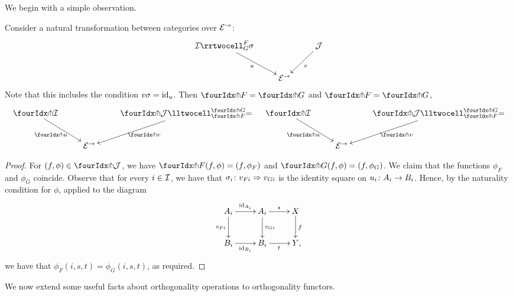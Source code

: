 \documentclass[reqno,10pt,a4paper,oneside,draft]{amsart}
\begin{document}
We begin with a simple observation. 

\begin{proposition} \label{thm:orth-nat}
Consider a natural transformation between categories over $\catE^\to$:
\[
\xymatrix{
  \cal{I}
  \rrtwocell_G^F{\sigma}
 \ar[dr]_{u}
&&
  \cal{J}
  \ar[dl]^{v}
\\&
  \catE^\to
}
\]
Note that this includes the condition $v \sigma = \id_u$.
Then $\liftr{F} = \liftr{G}$ and $\liftl{F} = \liftl{G}$, 
\begin{align*}
\xymatrix{
  \liftr{\cal{I}}
  \ar[dr]_{\liftr{u}}
&&
  \liftr{\cal{J}}
  \lltwocell_{\liftr{F}}^{\liftr{G}}{=}
  \ar[dl]^{\liftr{v}}
\\&
  \catE^\to
}
&&
\xymatrix{
  \liftl{\cal{I}}
  \ar[dr]_{\liftl{u}}
&&
  \liftl{\cal{J}}
  \lltwocell_{\liftl{F}}^{\liftl{G}}{=}
  \ar[dl]^{\liftl{v}}
\\&
  \catE^\to
}
\end{align*}
\end{proposition}

\begin{proof}
For $(f, \phi) \in \liftr{\cal{J}}$, we have $\liftr{F}(f, \phi) = (f, \phi_F)$ and $\liftr{G}(f, \phi) = (f, \phi_G)$.
We claim that the functions $\phi_F$ and $\phi_G$ coincide.
Observe that for every $i \in \cal{I}$, we have that $\sigma_i \co v_{Fi} \Rightarrow v_{Gi}$ is the identity square on $u_i \co A_i \to B_i$.
Hence, by the naturality condition for $\phi$, applied to the diagram
\[
\xymatrix{
  A_i \ar[r]^{\id_{A_i}} \ar[d]_{v_{Fi}} & A_i \ar[d]^{v_{Gi}} \ar[r]^{s} & X \ar[d]^{f} \\
  B_i \ar[r]_{\id_{B_i}} & B_i \ar[r]_{t} & Y
\rlap{,}}
\]
we have that $\phi_F(i, s, t) = \phi_G(i, s, t)$, as required.
\end{proof}

We now extend some useful facts about orthogonality operations to orthogonality functors.



\end{document}
